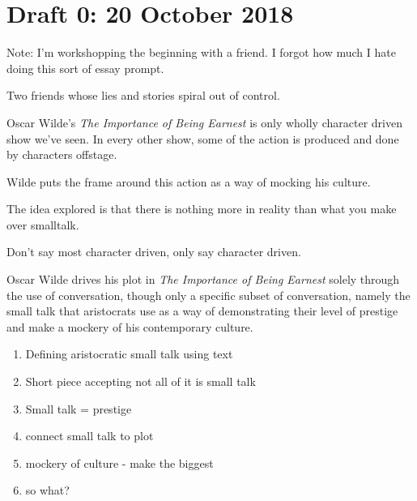 \documentclass[12pt]{article}[titlepage]
\newcommand{\1}{\={a}}
\newcommand{\2}{\={e}}
\newcommand{\3}{\={\i}}
\newcommand{\4}{\=o}
\newcommand{\5}{\=u}
\newcommand{\6}{\={A}}
\renewcommand{\,}{\textsuperscript{,}}
\begin{document}
\section{Draft 0: 20 October 2018}
Note: I'm workshopping the beginning with a friend. I forgot how much I hate doing this sort of essay prompt.

Two friends whose lies and stories spiral out of control.

Oscar Wilde's \textit{The Importance of Being Earnest} is only wholly character driven show we've seen.
In every other show, some of the action is produced and done by characters offstage.

Wilde puts the frame around this action as a way of mocking his culture.

The idea explored is that there is nothing more in reality than what you make over smalltalk.

Don't say most character driven, only say character driven.

Oscar Wilde drives his plot in \textit{The Importance of Being Earnest} solely through the use of conversation, though only a specific subset of conversation, namely the small talk that aristocrats use as a way of demonstrating their level of prestige and make a mockery of his contemporary culture.

\begin{enumerate}
\item Defining aristocratic small talk using text
\item Short piece accepting not all of it is small talk
\item Small talk = prestige
\item connect small talk to plot
\item mockery of culture - make the biggest
\item so what?
\end{enumerate}
\end{document}
